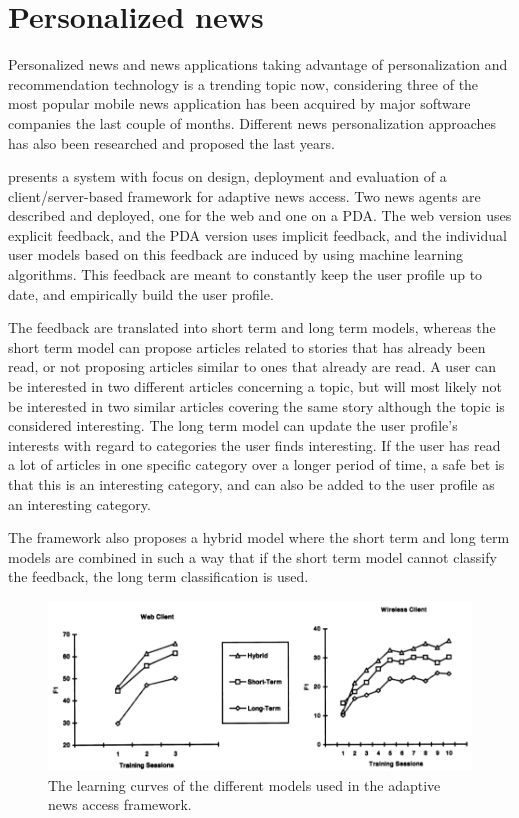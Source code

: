 \section{Personalized news}
Personalized news and news applications taking advantage of personalization and recommendation technology is a trending topic now, considering three of the most popular mobile news application has been acquired by major software companies the last couple of months\cite{linkedin_acquires_pulse}\cite{google_acquired_wavii}\cite{summly_sold_yahoo}. Different news personalization approaches has also been researched and proposed the last years.

\cite{billsus2000user} presents a system with focus on design, deployment and evaluation of a client/server-based framework for adaptive news access. Two news agents are described and deployed, one for the web and one on a PDA. The web version uses explicit feedback, and the PDA version uses implicit feedback, and the individual user models based on this feedback are induced by using machine learning algorithms. This feedback are meant to constantly keep the user profile up to date, and empirically build the user profile.

The feedback are translated into short term and long term models, whereas the short term model can propose articles related to stories that has already been read, or not proposing articles similar to ones that already are read. A user can be interested in two different articles concerning a topic, but will most likely not be interested in two similar articles covering the same story although the topic is considered interesting. The long term model can update the user profile's interests with regard to categories the user finds interesting. If the user has read a lot of articles in one specific category over a longer period of time, a safe bet is that this is an interesting category, and can also be added to the user profile as an interesting category.

The framework also proposes a hybrid model where the short term and long term models are combined in such a way that if the short term model cannot classify the feedback, the long term classification is used. 

\begin{figure}[!htbp]
\centering
\includegraphics[width=130mm]{GFX/tech/adaptiveNewsAccessShortLongHybridTerm.png}
\caption{The learning curves of the different models used in the adaptive news access framework.}
\label{adaptive_news_access_learning_curves}
\end{figure}

